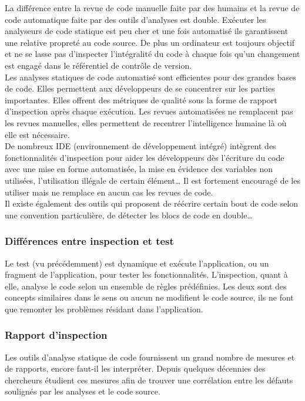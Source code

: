 \documentclass{report}
\begin{document}
      La différence entre la revue de code manuelle faite par des humains et la revue de code automatique  faite par des outils d’analyses est double. Exécuter les analyseurs  de code statique est peu cher et une fois automatisé ils garantissent une relative propreté au code source. De plus un ordinateur est toujours objectif et ne se lasse pas d’inspecter l’intégralité du code à chaque fois qu’un changement est engagé dans le référentiel de contrôle de version.\\

      Les analyses statiques de code automatisé sont efficientes pour des grandes bases de code. Elles permettent aux développeurs de se concentrer sur les parties importantes. Elles offrent des métriques de qualité sous la forme de rapport d’inspection après chaque exécution. Les revues automatisées ne remplacent pas les revues manuelles, elles permettent de recentrer l’intelligence humaine là où elle est nécessaire.\\

      De nombreux IDE (environnement de développement intégré) intègrent des fonctionnalités d’inspection pour aider les développeurs dès l’écriture du code avec une mise en forme automatisée, la mise en évidence des variables non utilisées, l’utilisation illégale de certain élément… Il est fortement encouragé de les utiliser mais ne remplace en aucun cas les revues de code.\\

      Il existe également des outils qui proposent de réécrire certain bout de code selon une convention particulière, de détecter les blocs de code en double…


        \subsubsection{Différences entre inspection et test}
        Le test (vu précédemment) est dynamique et exécute l’application, ou un fragment de l’application, pour tester les fonctionnalités. L’inspection, quant à elle, analyse le code selon un ensemble de règles prédéfinies. Les deux sont des concepts similaires dans le sens ou aucun ne modifient le code source, ils ne font que remonter les problèmes résidant dans l’application.

        \subsubsection{Rapport d’inspection}
        Les outils d’analyse statique de code fournissent un grand nombre de mesures et de rapports, encore faut-il les interpréter. Depuis quelques décennies des chercheurs étudient ces mesures afin de trouver une corrélation entre les défauts soulignés par les analyses et le code source.\\
\end{document}
